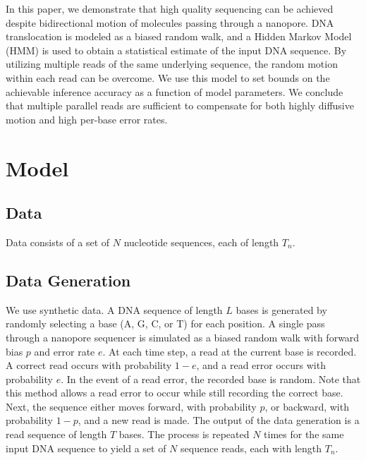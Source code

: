 \documentclass[12pt]{article}
\begin{document}
In this paper, we demonstrate that high quality sequencing can be achieved despite bidirectional motion of molecules passing through a nanopore. DNA translocation is modeled as a biased random walk, and a Hidden Markov Model (HMM) is used to obtain a statistical estimate of the input DNA sequence. By utilizing multiple reads of the same underlying sequence, the random motion within each read can be overcome. We use this model to set bounds on the achievable inference accuracy as a function of model parameters. We conclude that multiple parallel reads are sufficient to compensate for both highly diffusive motion and high per-base error rates.


\section{Model}

\subsection{Data}
Data consists of a set of $N$ nucleotide sequences, each of length $T_n$.


\subsection{Data Generation}

We use synthetic data. A DNA sequence of length $L$ bases is generated by randomly selecting a base (A, G, C, or T) for each position. A single pass through a nanopore sequencer is simulated as a biased random walk with forward bias $p$ and error rate $e$. At each time step, a read at the current base is recorded. A correct read occurs with probability $1-e$, and a read error occurs with probability $e$. In the event of a read error, the recorded base is random. Note that this method allows a read error to occur while still recording the correct base. Next, the sequence either moves forward, with probability $p$, or backward, with probability $1-p$, and a new read is made. The output of the data generation is a read sequence of length $T$ bases. The process is repeated $N$ times for the same input DNA sequence to yield a set of $N$ sequence reads, each with length $T_n$.
\end{document}
